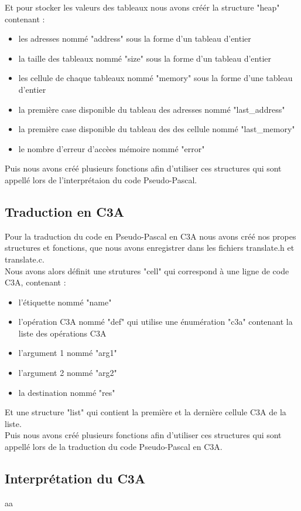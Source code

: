 \documentclass{report}
\begin{document}
Et pour stocker les valeurs des tableaux nous avons créér la structure "heap" contenant :
\begin{itemize}
\item les adresses nommé "address" sous la forme d'un tableau d'entier
\item la taille des tableaux nommé "size" sous la forme d'un tableau d'entier
\item les cellule de chaque tableaux nommé "memory" sous la forme d'une tableau d'entier
\item la première case disponible du tableau des adresses nommé "last\_address"
\item la première case disponible du tableau des des cellule nommé "last\_memory"
\item le nombre d'erreur d'accèes mémoire nommé "error"
\end{itemize}
\bigskip

Puis nous avons créé plusieurs fonctions afin d'utiliser ces structures qui sont appellé lors de l'interprétaion du code Pseudo-Pascal.

\subsection{Traduction en C3A}
Pour la traduction du code en Pseudo-Pascal en C3A nous avons créé nos propes structures et fonctions, que nous avons enregistrer dans les fichiers translate.h et translate.c.\\

Nous avons alors définit une strutures "cell" qui correspond à une ligne de code C3A, contenant :
\begin{itemize}
\item l'étiquette nommé "name"
\item l'opération C3A nommé "def" qui utilise une énumération "c3a" contenant la liste des opérations C3A
\item l'argument 1 nommé "arg1"
\item l'argument 2 nommé "arg2"
\item la destination nommé "res"
\end{itemize}
\bigskip

Et une structure "list" qui contient la première et la dernière cellule C3A de la liste.\\

Puis nous avons créé plusieurs fonctions afin d'utiliser ces structures qui sont appellé lors de la traduction du code Pseudo-Pascal en C3A.

\subsection{Interprétation du C3A}
aa
\end{document}
